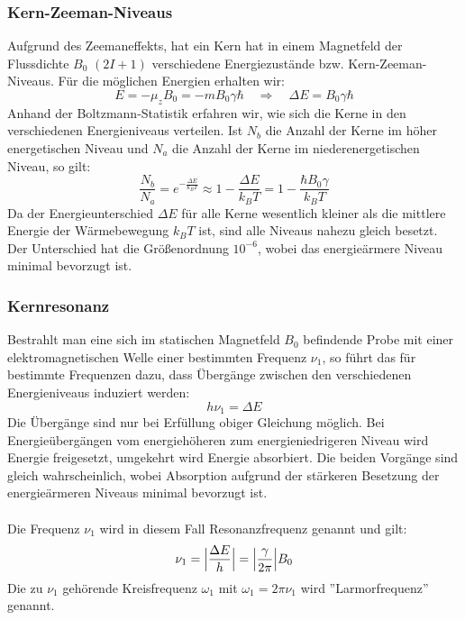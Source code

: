 \documentclass[a4paper,titlepage]{scrartcl}
\DeclarePairedDelimiter\abs{\lvert}{\rvert}
\numberwithin{equation}{section}
\begin{document}
\subsubsection{Kern-Zeeman-Niveaus}
Aufgrund des Zeemaneffekts, hat ein Kern hat in einem Magnetfeld der Flussdichte $B_0$ $(2I + 1)$ verschiedene Energiezustände bzw. Kern-Zeeman-Niveaus. Für die möglichen Energien erhalten wir:
\begin{equation*}
E=-\mu_zB_0=-mB_0\gamma \hbar \quad \Rightarrow \quad \Delta E=B_0 \gamma \hbar
\end{equation*}
Anhand der Boltzmann-Statistik erfahren wir, wie sich die Kerne in den verschiedenen Energieniveaus verteilen. Ist $N_b$ die Anzahl der Kerne im höher energetischen Niveau und $N_a$ die Anzahl der Kerne im niederenergetischen Niveau, so gilt:
\begin{equation*}
\frac{N_b}{N_a}=e^{-\frac{\Delta E}{k_B T}} \approx 1 - \frac{\Delta E}{k_B T}=1-\frac{\hbar B_0 \gamma}{k_B T}
\end{equation*}
Da der Energieunterschied $\Delta E$ für alle Kerne wesentlich kleiner als die mittlere Energie der Wärmebewegung $k_B T$ ist, sind alle Niveaus nahezu gleich besetzt. Der Unterschied hat die Größenordnung $10^{-6}$, wobei das energieärmere Niveau minimal bevorzugt ist.
\subsubsection{Kernresonanz}
Bestrahlt man eine sich im statischen Magnetfeld $B_0$ befindende Probe mit einer elektromagnetischen Welle einer bestimmten Frequenz $\nu_1$, so führt das für bestimmte Frequenzen dazu, dass Übergänge zwischen den verschiedenen Energieniveaus induziert werden:
\begin{equation*}
h \nu_1=\Delta E
\end{equation*}
Die Übergänge sind nur bei Erfüllung obiger Gleichung möglich. Bei Energieübergängen vom energiehöheren zum energieniedrigeren Niveau wird Energie freigesetzt, umgekehrt wird Energie absorbiert. Die beiden Vorgänge sind gleich wahrscheinlich, wobei Absorption aufgrund der stärkeren Besetzung der energieärmeren Niveaus minimal bevorzugt ist.\\ \\
Die Frequenz $\nu_1$ wird in diesem Fall Resonanzfrequenz genannt und gilt:
\begin{equation*}
\nu_1=\abs[\Big]{\frac{\Delta E}{h}}=\abs[\Big]{\frac{\gamma}{2 \pi}}B_0
\end{equation*}
Die zu $\nu_1$ gehörende Kreisfrequenz $\omega_1$ mit $\omega_1=2 \pi \nu_1$ wird ''Larmorfrequenz'' genannt.
\end{document}
